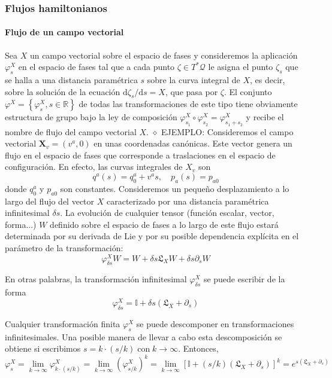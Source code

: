 \subsubsection{Flujos hamiltonianos}

\paragraph{Flujo de un campo vectorial}

Sea $X$ un campo vectorial sobre el espacio de fases y consideremos la aplicación $\varphi_{s}^{X}$ en el espacio de fases tal que a cada punto $\zeta \in T^{*} \mathscr{Q}$ le asigna el punto $\zeta_{s}$ que se halla a una distancia paramétrica $s$ sobre la curva integral de $X$, es decir, sobre la solución de la ecuación $\mathrm{d} \zeta_{s} / \mathrm{d} s=X$, que pasa por $\zeta$. El conjunto $\varphi^{X}=\left\{\varphi_{s}^{X}, s \in \mathbb{R}\right\}$ de todas las transformaciones de este tipo tiene obviamente estructura de grupo bajo la ley de composición $\varphi_{s_{1}}^{X} \circ \varphi_{s_{2}}^{X}=\varphi_{s_{1}+s_{2}}^{X}$ y recibe el nombre de flujo del campo vectorial $X$.
$\diamond$ EJEMPLO: Consideremos el campo vectorial $\boldsymbol{X}_{v}=\left(v^{a}, 0\right)$ en unas coordenadas canónicas. Este vector genera un flujo en el espacio de fases que corresponde a traslaciones en el espacio de configuración. En efecto, las curvas integrales de $X_{v}$ son
$$
q^{a}(s)=q_{0}^{a}+v^{a} s, \quad p_{a}(s)=p_{a 0}
$$
donde $q_{0}^{a}$ y $p_{a 0}$ son constantes.
Consideremos un pequeño desplazamiento a lo largo del flujo del vector $X$ caracterizado por una distancia paramétrica infinitesimal $\delta s$. La evolución de cualquier tensor (función escalar, vector, forma...) $W$ definido sobre el espacio de fases a lo largo de este flujo estará determinada por su derivada de Lie y por su posible dependencia explícita en el parámetro de la transformación:
$$
\varphi_{\delta s}^{X} W=W+\delta s \mathfrak{L}_{X} W+\delta s \partial_{s} W
$$

En otras palabras, la transformación infinitesimal $\varphi_{\delta s}^{X}$ se puede escribir de la forma
$$
\varphi_{\delta s}^{X}=\mathbb{I}+\delta s\left(\mathfrak{L}_{X}+\partial_{s}\right)
$$

Cualquier transformación finita $\varphi_{s}^{X}$ se puede descomponer en transformaciones infinitesimales. Una posible manera de llevar a cabo esta descomposición se obtiene si escribimos $s=k \cdot(s / k) \operatorname{con} k \rightarrow \infty$. Entonces,
$$
\varphi_{s}^{X}=\lim _{k \rightarrow \infty} \varphi_{k \cdot(s / k)}^{X}=\lim _{k \rightarrow \infty}\left(\varphi_{s / k}^{X}\right)^{k}=\lim _{k \rightarrow \infty}\left[\mathbb{I}+(s / k)\left(\mathfrak{L}_{X}+\partial_{s}\right)\right]^{k}=e^{s\left(\mathfrak{L}_{X}+\partial_{s}\right)}
$$

